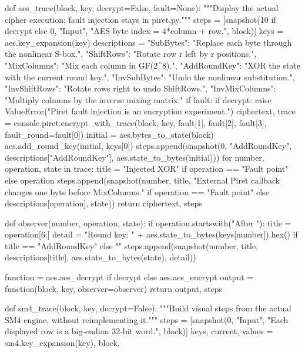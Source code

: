 \begin{lightcode}[numbers=left,firstnumber=1]
def aes_trace(block, key, decrypt=False, fault=None):
    """Display the actual cipher execution; fault injection stays in piret.py."""
    steps = [snapshot(10 if decrypt else 0, "Input", "AES byte index = 4*column + row.", block)]
    keys = aes.key_expansion(key)
    descriptions = {"SubBytes": "Replace each byte through the nonlinear S-box.", "ShiftRows": "Rotate row r left by r positions.", "MixColumns": "Mix each column in GF(2^8).", "AddRoundKey": "XOR the state with the current round key.", "InvSubBytes": "Undo the nonlinear substitution.", "InvShiftRows": "Rotate rows right to undo ShiftRows.", "InvMixColumns": "Multiply columns by the inverse mixing matrix."}
    if fault:
        if decrypt:
            raise ValueError("Piret fault injection is an encryption experiment.")
        ciphertext, trace = console.piret.encrypt_with_trace(block, key, fault[1], fault[2], fault[3], fault_round=fault[0])
        initial = aes.bytes_to_state(block)
        aes.add_round_key(initial, keys[0])
        steps.append(snapshot(0, "AddRoundKey", descriptions["AddRoundKey"], aes.state_to_bytes(initial)))
        for number, operation, state in trace:
            title = "Injected XOR" if operation == "Fault point" else operation
            steps.append(snapshot(number, title, "External Piret callback changes one byte before MixColumns." if operation == "Fault point" else descriptions[operation], state))
        return ciphertext, steps

    def observer(number, operation, state):
        if operation.startswith("After "):
            title = operation[6:]
            detail = "Round key: " + aes.state_to_bytes(keys[number]).hex() if title == "AddRoundKey" else ""
            steps.append(snapshot(number, title, descriptions[title], aes.state_to_bytes(state), detail))

    function = aes.aes_decrypt if decrypt else aes.aes_encrypt
    output = function(block, key, observer=observer)
    return output, steps


def sm4_trace(block, key, decrypt=False):
    """Build visual steps from the actual SM4 engine, without reimplementing it."""
    steps = [snapshot(0, "Input", "Each displayed row is a big-endian 32-bit word.", block)]
    keys, current, values = sm4.key_expansion(key), block, {}


\end{lightcode}
